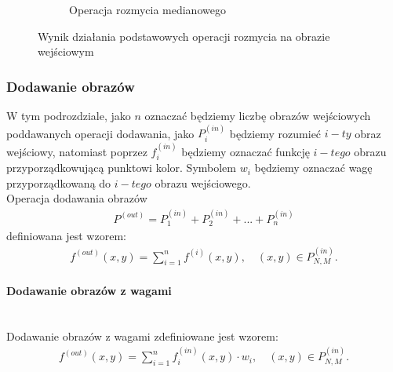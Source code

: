 \begin{figure}
\begin{subfigure}[b]{0.45\textwidth}
    \caption{Operacja rozmycia medianowego}
    \label{fig:smooth_lena_gauss}
  \end{subfigure}
  \caption{Wynik działania podstawowych operacji rozmycia na obrazie wejściowym}
  \label{fig:lena_smooth}
\end{figure}
\subsubsection{Dodawanie obrazów}
W tym podrozdziale, jako $n$ oznaczać będziemy liczbę obrazów wejściowych poddawanych operacji dodawania, jako $P^{(in)}_{i}$ będziemy rozumieć $i-ty$ obraz wejściowy, natomiast poprzez $f^{(in)}_i$ będziemy oznaczać funkcję $i-tego$ obrazu przyporządkowującą punktowi kolor. Symbolem $w_i$ będziemy oznaczać wagę przyporządkowaną do $i-tego$ obrazu wejściowego.\\
Operacja dodawania obrazów 
\begin{gather*}
P^{(out)} = P_1^{(in)} + P_2^{(in)} + ... + P_n^{(in)}
\end{gather*}
definiowana jest wzorem:
\begin{gather*}
  f^{(out)}(x, y) = \displaystyle\sum_{i=1}^{n} f^{(i)}(x, y), \quad (x, y) \in P^{(in)}_{N,M}.
\end{gather*}
\paragraph{Dodawanie obrazów z wagami} \mbox{}\\
Dodawanie obrazów z wagami zdefiniowane jest wzorem:
\begin{gather*}
  f^{(out)}(x, y) = \displaystyle\sum_{i=1}^{n} f^{(in)}_i(x, y) \cdot w_i, \quad (x, y) \in P^{(in)}_{N,M}.
\end{gather*}
